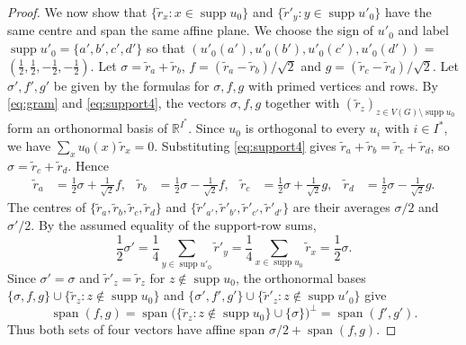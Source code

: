 \documentclass[10pt,a4paper]{article}
\theoremstyle{plain}
\theoremstyle{definition}
\DeclareMathOperator{\supp}{supp}
\DeclareMathOperator{\spn}{span}
\newcommand{\R}{\mathbb{R}}
\begin{document}
\begin{proof}
  We now show that $\{\tilde{r}_x:x\in\supp u_0\}$ and
  $\{\tilde{r}'_y:y\in\supp u'_0\}$ have the same centre and span the
  same affine plane.
  We choose the sign of $u'_0$ and label
  $\supp u'_0=\{a',b',c',d'\}$ so that
  $(u'_0(a'),u'_0(b'),u'_0(c'),u'_0(d'))=$
  $(\tfrac12,\tfrac12,-\tfrac12,-\tfrac12)$.
  Let $\sigma = \tilde{r}_a + \tilde{r}_b$,
  $f = (\tilde{r}_a - \tilde{r}_b)/\sqrt{2}$ and
  $g = (\tilde{r}_c - \tilde{r}_d)/\sqrt{2}$.
  Let $\sigma',f',g'$ be given by the formulas for $\sigma,f,g$ with
  primed vertices and rows.
  By \cref{eq:gram} and
  \cref{eq:support4}, the vectors $\sigma,f,g$ together with
  $(\tilde{r}_z)_{z\in V(G)\setminus\supp u_0}$ form an orthonormal basis of
  $\R^{I^*}$. Since $u_0$ is orthogonal to every $u_i$ with $i\in I^*$,
  we have $\sum_xu_0(x)\tilde{r}_x=0$.
  Substituting \cref{eq:support4} gives
  $\tilde{r}_a+\tilde{r}_b=\tilde{r}_c+\tilde{r}_d$, so $\sigma=\tilde{r}_c+\tilde{r}_d$. Hence
  \begin{equation}
    \label{eq:special-rows}
    \begin{aligned}
    \tilde{r}_a &= \frac{1}{2} \sigma + \frac{1}{\sqrt{2}} f, &
    \tilde{r}_b &= \frac{1}{2} \sigma - \frac{1}{\sqrt{2}} f, &
    \tilde{r}_c &= \frac{1}{2} \sigma + \frac{1}{\sqrt{2}} g, &
    \tilde{r}_d &= \frac{1}{2} \sigma - \frac{1}{\sqrt{2}} g.
    \end{aligned}
  \end{equation}
  The centres of $\{\tilde{r}_a,\tilde{r}_b,\tilde{r}_c,\tilde{r}_d\}$ and
  $\{\tilde{r}'_{a'},\tilde{r}'_{b'},\tilde{r}'_{c'},\tilde{r}'_{d'}\}$ are their averages
  $\sigma/2$ and $\sigma'/2$. By the assumed equality of the support-row sums,
  \begin{equation}\label{eq:quartet-offset}
    \frac12\sigma'=\frac14\sum_{y\in\supp u'_0}\tilde{r}'_y
    =\frac14\sum_{x\in\supp u_0}\tilde{r}_x=\frac12\sigma.
  \end{equation}
  Since $\sigma'=\sigma$ and $\tilde{r}'_z=\tilde{r}_z$ for
  $z\notin\supp u_0$, the orthonormal bases
  $\{\sigma,f,g\}\cup\{\tilde{r}_z:z\notin\supp u_0\}$ and
  $\{\sigma',f',g'\}\cup\{\tilde{r}'_z:z\notin\supp u'_0\}$ give
  \begin{equation}\label{eq:quartet-plane}
   \spn(f,g)
   =\spn\bigl(\{\tilde{r}_z:z\notin\supp u_0\}\cup\{\sigma\}\bigr)^\perp
   =\spn(f',g').
  \end{equation}
  Thus both sets of four vectors have affine span $\sigma/2+\spn(f,g)$.


\end{proof}
\end{document}
